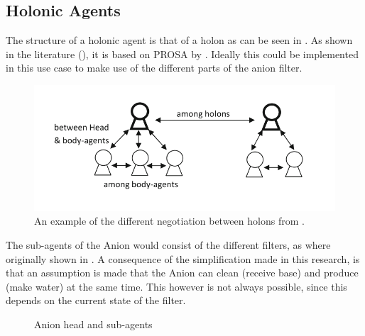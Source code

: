 \subsection{Holonic Agents}
The structure of a holonic agent is that of a holon as can be seen in . As shown in the literature (), it is based on PROSA by \citep{van1998reference}. Ideally this could be implemented in this use case to make use of the different parts of the anion filter.
\begin{figure}[h]
	\centering
	\includegraphics[width=0.7\linewidth]{img/holon_example}
	\caption{An example of the different negotiation between holons from \citet{beheshti2016negotiations}.}
	\label{fig:holonexample}
\end{figure}

The sub-agents of the Anion would consist of the different filters, as where originally shown in . A consequence of the simplification made in this research, is that an assumption is made that the Anion can clean (receive base) and produce (make water) at the same time. This however is not always possible, since this depends on the current state of the filter. 
\begin{figure}[h]
	
	\centering
	\caption{Anion head and sub-agents}
	\label{fig:anion-head-sub}
	
\end{figure}


